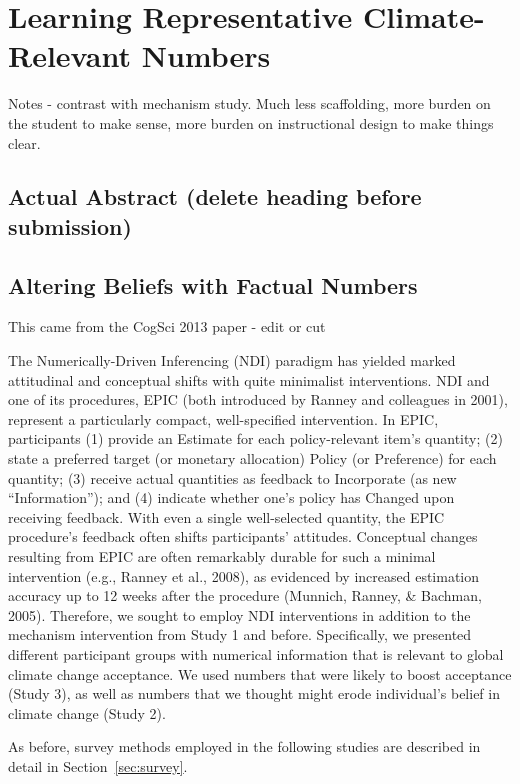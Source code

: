 \graphicspath{{pro-ndi/}}

\chapter{Learning Representative Climate-Relevant Numbers}
\label{chap:prondi}

Notes - contrast with mechanism study. Much less scaffolding, more burden on the
student to make sense, more burden on instructional design to make things clear.

\section{Actual Abstract (delete heading before submission)}

\section{Altering Beliefs with Factual Numbers}

This came from the CogSci 2013 paper - edit or cut

The Numerically-Driven Inferencing (NDI) paradigm has yielded marked
attitudinal and conceptual shifts with quite minimalist interventions. NDI and
one of its procedures, EPIC (both introduced by Ranney and colleagues in 2001),
represent a particularly compact, well-specified intervention. In EPIC,
participants (1) provide an Estimate for each policy-relevant item’s quantity;
(2) state a preferred target (or monetary allocation) Policy (or Preference) for
each quantity; (3) receive actual quantities as feedback to Incorporate (as new
``Information''); and (4) indicate whether one’s policy has Changed upon receiving
feedback. With even a single well-selected quantity, the EPIC procedure’s
feedback often shifts participants’ attitudes. Conceptual changes resulting from
EPIC are often remarkably durable for such a minimal intervention (e.g., Ranney
et al., 2008), as evidenced by increased estimation accuracy up to 12 weeks
after the procedure (Munnich, Ranney, \& Bachman, 2005). Therefore, we sought to
employ NDI interventions in addition to the mechanism intervention from Study 1
and before. Specifically, we presented different participant groups with
numerical information that is relevant to global climate change acceptance. We
used numbers that were likely to boost acceptance (Study 3), as well as numbers
that we thought might erode individual's belief in climate change (Study 2).

As before, survey methods employed in the following studies are described in
detail in Section~\ref{sec:survey}.

